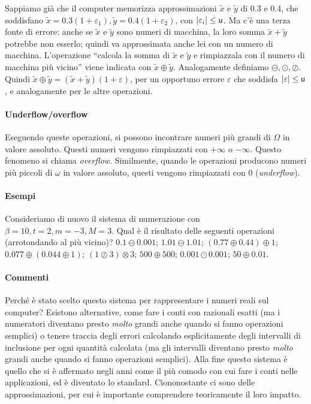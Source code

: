 \documentclass[a4paper]{report}
\DeclarePairedDelimiter{\abs}{\lvert}{\rvert}
\theoremstyle{definiton}
\theoremstyle{remark}
\begin{document}
Sappiamo già che il computer memorizza approssimazioni $\tilde{x}$ e $\tilde{y}$ di 0.3 e 0.4, che soddisfano $\tilde{x} = 0.3(1+\varepsilon_1), \tilde{y} = 0.4(1+\varepsilon_2)$, con $\abs{\varepsilon_i} \leq \mathsf{u}$. Ma c'è una terza fonte di errore: anche se $\tilde{x}$ e $\tilde{y}$ sono numeri di macchina, la loro somma $\tilde{x} + \tilde{y}$ potrebbe non esserlo; quindi va approssimata anche lei con un numero di macchina. L'operazione ``calcola la somma di $\tilde{x}$ e $\tilde{y}$ e rimpiazzala con il numero di macchina più vicino'' viene indicata con $\tilde{x} \oplus \tilde{y}$. Analogamente definiamo $\ominus, \odot, \oslash$. Quindi $ \tilde{x} \oplus \tilde{y} = (\tilde{x}+\tilde{y})(1+\varepsilon)$, per un opportuno errore $\varepsilon$ che soddisfa $\abs{\varepsilon} \leq \mathsf{u}$, e analogamente per le altre operazioni.

\paragraph{Underflow/overflow}

Eseguendo queste operazioni, si possono incontrare numeri più grandi di $\Omega$ in valore assoluto. Questi numeri vengono rimpiazzati con $+\infty$ o $-\infty$. Questo fenomeno si chiama \emph{overflow}. Similmente, quando le operazioni producono numeri più piccoli di $\omega$ in valore assoluto, questi vengono rimpiazzati con $0$ (\emph{underflow}).

\paragraph{Esempi} Consideriamo di nuovo il sistema di numerazione con $\beta=10, t=2, m=-3, M=3$. Qual è il risultato delle seguenti operazioni (arrotondando al più vicino)? $0.1 \ominus 0.001$; $1.01 \ominus 1.01$; $(0.77 \oplus 0.44) \oplus 1$; $0.077 \oplus (0.044 \oplus 1)$; $(1 \oslash 3) \otimes 3$; $500 \oplus 500$; $0.001 \odot 0.001$; $50 \oplus 0.01$.


\paragraph{Commenti} Perché è stato scelto questo sistema per rappresentare i numeri reali sul computer? Esistono alternative, come fare i conti con razionali esatti (ma i numeratori diventano presto \emph{molto} grandi anche quando si fanno operazioni semplici) o tenere traccia degli errori calcolando esplicitamente degli intervalli di inclusione per ogni quantità calcolata (ma gli intervalli diventano presto \emph{molto} grandi anche quando si fanno operazioni semplici). Alla fine questo sistema è quello che si è affermato negli anni come il più comodo con cui fare i conti nelle applicazioni, ed è diventato lo standard. Ciononostante ci sono delle approssimazioni, per cui è importante comprendere teoricamente il loro impatto.
\end{document}
